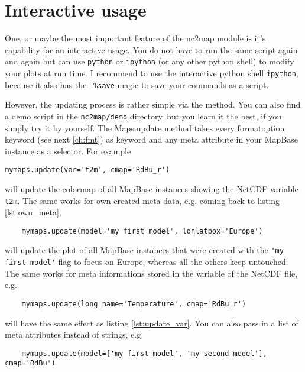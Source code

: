 \chapter{Interactive usage} \label{ch:interactive}
One, or maybe the most important feature of the \gls{nc2map} module is it's capability for an interactive usage. You do not have to run the same script again and again but can use \lstinline|python| or \lstinline|ipython| (or any other python shell) to modify your plots at run time. I recommend to use the interactive python shell \lstinline|ipython|, because it also has the \lstinline| %save| magic to save your commands as a script.

However, the updating process is rather simple via the  method. You can also find a demo script in the \lstinline|nc2map/demo| directory, but you learn it the best, if you simply try it by yourself. The \gls{Maps.update} method takes every
formatoption keyword (see next \autoref{ch:fmt}) as keyword and any meta attribute in your \gls{MapBase} instance as a selector.
For example
\begin{lstlisting}[label={lst:update_var}, caption={Update formatoptions variable specific}]
	mymaps.update(var='t2m', cmap='RdBu_r')
\end{lstlisting}
will update the colormap of all \gls{MapBase} instances showing the NetCDF variable \lstinline|t2m|. The same works for own created meta data, e.g. coming back to listing \ref{lst:own_meta},
\begin{lstlisting}
	mymaps.update(model='my first model', lonlatbox='Europe')
\end{lstlisting}
will update the plot of all \gls{MapBase} instances that were created with the \lstinline|'my first model'| flag to focus on Europe, whereas all the others keep untouched. The same works for meta informations stored in the variable of the NetCDF file, e.g.
\begin{lstlisting}
	mymaps.update(long_name='Temperature', cmap='RdBu_r')
\end{lstlisting}
will have the same effect as listing \ref{lst:update_var}. You can also pass in a list of meta attributes instead of strings, e.g
\begin{lstlisting}
	mymaps.update(model=['my first model', 'my second model'], cmap='RdBu')
\end{lstlisting}
